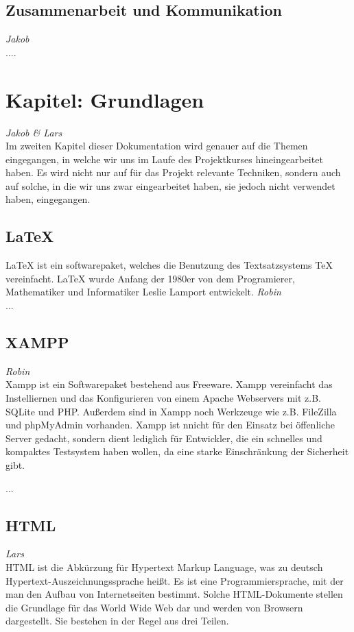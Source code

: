 \documentclass[12pt,a4paper,bibliography=totocnumbered,listof=totocnumbered]{scrartcl}
\begin{document}
\subsection{Zusammenarbeit und Kommunikation}
\emph{Jakob}\\
....

\pagebreak

\section{Kapitel: Grundlagen}
\emph{Jakob \emph{\&} Lars}\\
Im zweiten Kapitel dieser Dokumentation wird genauer auf die Themen eingegangen, in welche wir uns im Laufe des Projektkurses hineingearbeitet haben. Es wird nicht nur auf für das Projekt relevante Techniken, sondern auch auf solche, in die wir uns zwar eingearbeitet haben, sie jedoch nicht verwendet haben, eingegangen.

\subsection{\LaTeX{}}
\label{sec:LaTeX}
LaTeX ist ein softwarepaket, welches die Benutzung des Textsatzsystems TeX vereinfacht. LaTeX wurde Anfang der 1980er von dem Programierer, Mathematiker und Informatiker Leslie Lamport entwickelt.\cite{LaTeX}\cite{Lamport}
\emph{Robin}\\
...

\subsection{XAMPP}
\label{sec:XAMPP}
\emph{Robin}\\
Xampp ist ein Softwarepaket bestehend aus Freeware. Xampp vereinfacht das Instelliernen und das Konfigurieren von einem Apache Webservers mit z.B. SQLite und PHP. Außerdem sind in Xampp noch Werkzeuge wie z.B. FileZilla und phpMyAdmin vorhanden. Xampp ist nnicht für den Einsatz bei öffenliche Server gedacht, sondern dient lediglich für Entwickler, die ein schnelles und kompaktes Testsystem haben wollen, da eine starke Einschränkung der Sicherheit gibt.\cite{XAMPP}

...

\subsection{HTML}
\label{sec:HTML}
\emph{Lars}\\
HTML ist die Abkürzung für \glqq Hypertext Markup Language\grqq, was zu deutsch \glqq Hypertext-Auszeichnungssprache\grqq{} heißt. Es ist eine Programmiersprache, mit der man den Aufbau von Internetseiten bestimmt. Solche HTML-Dokumente stellen die Grundlage für das World Wide Web dar und werden von Browsern dargestellt.\cite{HTML}\cite{Hypertext_Markup_Language} Sie bestehen in der Regel aus drei Teilen.\cite{HTML/Dokumentstruktur_und_Aufbau} 
\end{document}
